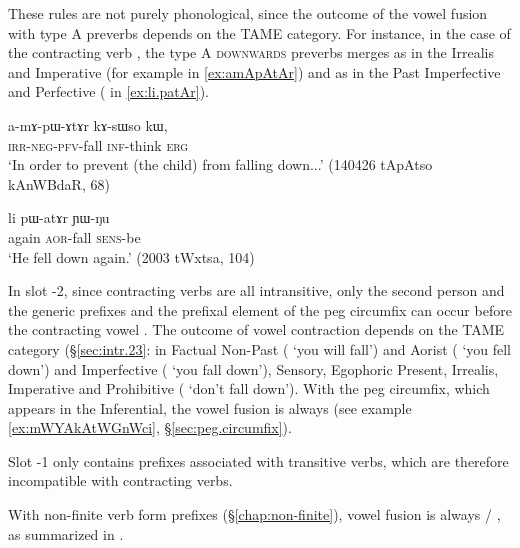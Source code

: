  These rules are not purely phonological, since the outcome of the vowel fusion with type A preverbs depends on the TAME category. For instance, in the case of the contracting verb , the type A \textsc{downwards}  preverbs merges as  in the Irrealis and Imperative (for example   in \ref{ex:amApAtAr}) and as  in the Past Imperfective and Perfective (  in \ref{ex:li.patAr}).
 
 \begin{exe}
 	\ex \label{ex:amApAtAr}
 	\gll   a-mɤ-pɯ-ɤtɤr kɤ-sɯso kɯ, \\
 	\textsc{irr}-\textsc{neg}-\textsc{pfv}-fall \textsc{inf}-think \textsc{erg} \\
 	\glt `In order to prevent (the child) from falling down...' (140426 tApAtso kAnWBdaR, 68)
 \end{exe}
 
 \begin{exe}
 	\ex \label{ex:li.patAr}
 	\gll li pɯ-atɤr ɲɯ-ŋu \\
 	again \textsc{aor}-fall \textsc{sens}-be \\
 	\glt `He fell down again.' (2003 tWxtsa, 104)
 \end{exe}
 
 In slot -2, since contracting verbs are all intransitive, only the second person  and the generic  prefixes and the prefixal element  of the peg circumfix can occur before the contracting vowel . The outcome of vowel contraction depends on the TAME category (§\ref{sec:intr.23}:   in Factual Non-Past ( `you will fall') and Aorist ( `you fell down') and    Imperfective ( `you fall down'), Sensory, Egophoric Present, Irrealis, Imperative and Prohibitive ( `don't fall down'). With the peg circumfix, which appears in the Inferential, the vowel fusion is always  (see example \ref{ex:mWYAkAtWGnWci}, §\ref{sec:peg.circumfix}).
 
 Slot -1 only contains prefixes associated with transitive verbs, which are therefore incompatible with contracting verbs.
 
 With non-finite verb form prefixes  (§\ref{chap:non-finite}),  vowel fusion is always  / , as summarized in .
 
